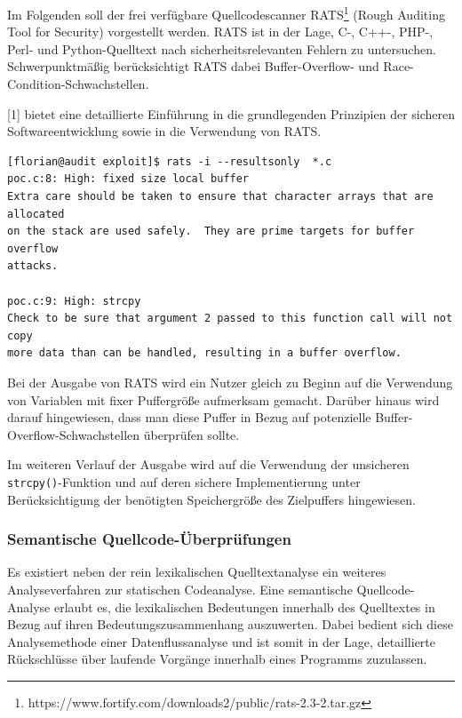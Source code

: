 Im Folgenden soll der frei verfügbare Quellcodescanner RATS\footnote{https://www.fortify.com/downloads2/public/rats-2.3-2.tar.gz} 
(Rough Auditing Tool for Security) vorgestellt werden. RATS ist in der 
Lage, C-, C++-, PHP-, Perl- und Python-Quelltext nach 
sicherheitsrelevanten Fehlern zu untersuchen. Schwerpunktmäßig 
berücksichtigt RATS dabei Buffer-Overflow- und Race-Condition-Schwachstellen.

[1] bietet eine detaillierte Einführung in die grundlegenden Prinzipien 
der sicheren Softwareentwicklung sowie in die Verwendung von RATS.

\begin{lstlisting}[basicstyle=\ttfamily\footnotesize]
[florian@audit exploit]$ rats -i --resultsonly  *.c
poc.c:8: High: fixed size local buffer
Extra care should be taken to ensure that character arrays that are allocated
on the stack are used safely.  They are prime targets for buffer overflow
attacks.

poc.c:9: High: strcpy
Check to be sure that argument 2 passed to this function call will not copy
more data than can be handled, resulting in a buffer overflow.
\end{lstlisting}

Bei der Ausgabe von RATS wird ein Nutzer gleich zu Beginn auf die 
Verwendung von Variablen mit fixer Puffergröße aufmerksam gemacht. 
Darüber hinaus wird darauf hingewiesen, dass man diese Puffer in 
Bezug auf potenzielle Buffer-Overflow-Schwachstellen überprüfen sollte.

Im weiteren Verlauf der Ausgabe wird auf die Verwendung der 
unsicheren \texttt{strcpy()}-Funktion und auf deren sichere 
Implementierung unter Berücksichtigung der benötigten Speichergröße 
des Zielpuffers hingewiesen.

\subsubsection{Semantische Quellcode-Überprüfungen}

Es existiert neben der rein lexikalischen Quelltextanalyse ein weiteres 
Analyseverfahren zur statischen Codeanalyse. Eine semantische 
Quellcode-Analyse erlaubt es, die lexikalischen Bedeutungen innerhalb des 
Quelltextes in Bezug auf ihren Bedeutungszusammenhang auszuwerten. 
Dabei bedient sich diese Analysemethode einer Datenflussanalyse und ist 
somit in der Lage, detaillierte Rückschlüsse über laufende Vorgänge 
innerhalb eines Programms zuzulassen.


